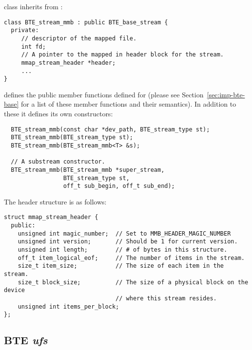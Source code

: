  class inherits from :
\begin{verbatim}
class BTE_stream_mmb : public BTE_base_stream {
  private:
     // descriptor of the mapped file.  
     int fd;   
     // A pointer to the mapped in header block for the stream. 
     mmap_stream_header *header;
     ...
}  
\end{verbatim}

 defines the public member
functions defined for  (please see
Section~\ref{sec:imp-bte-base} for a list of these member
functions and their semantics).  In addition to these it
defines its own constructors: 

\begin{verbatim}
  BTE_stream_mmb(const char *dev_path, BTE_stream_type st);
  BTE_stream_mmb(BTE_stream_type st); 
  BTE_stream_mmb(BTE_stream_mmb<T> &s); 
  
  // A substream constructor.
  BTE_stream_mmb(BTE_stream_mmb *super_stream,
                 BTE_stream_type st,
                 off_t sub_begin, off_t sub_end);
\end{verbatim}

The  header
structure is as follows:

\begin{verbatim}
struct mmap_stream_header { 
  public:
    unsigned int magic_number;  // Set to MMB_HEADER_MAGIC_NUMBER
    unsigned int version;       // Should be 1 for current version.
    unsigned int length;        // # of bytes in this structure.
    off_t item_logical_eof;     // The number of items in the stream.
    size_t item_size;           // The size of each item in the stream.
    size_t block_size;          // The size of a physical block on the device
                                // where this stream resides.
    unsigned int items_per_block;
};
\end{verbatim}




\subsection{BTE \emph{ufs}}

